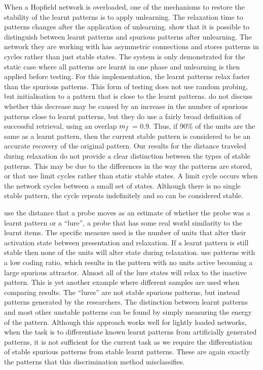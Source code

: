 When a Hopfield network is overloaded, one of the mechanisms to restore the stability of the learnt patterns is to apply unlearning.  The relaxation time to patterns changes after the application of unlearning.  
\citet{Horas2002} show that it is possible to distinguish between learnt patterns and spurious patterns after unlearning.  The network they are working with has asymmetric connections and stores patterns in cycles rather than just stable states.  The system is only demonstrated for the static case where all patterns are learnt in one phase and unlearning is then applied before testing.  For this implementation, the learnt patterns relax faster than the spurious patterns.  This form of testing does not use random probing, but initialisation to a pattern that is close to the learnt patterns. \citeauthor{Horas2002} do not discuss whether this decrease may be caused by an increase in the number of spurious patterns close to learnt patterns, but they do use a fairly broad definition of successful retrieval, using an overlap $m_f$ = 0.9.  Thus, if 90\% of the units are the same as a learnt pattern,  then the current stable pattern is considered to be an accurate recovery of the original pattern.  Our results for the distance traveled during relaxation do not provide a clear distinction between the types of stable patterns.  This may be due to the differences in the way the patterns are stored, or that \citet{Horas2002} use limit cycles rather than static stable states.  A limit cycle occurs when the network cycles between a small set of states.  Although there is no single stable pattern, the cycle repeats indefinitely and so can be considered stable.


\citet{OReilly1998} use the distance that a probe moves as an estimate of whether the probe was a learnt pattern or a ``lure'', a probe that has some real world similarity to the learnt items.  The specific measure used is the number of units that alter their activation state between presentation and relaxation.  If a learnt pattern is still stable then none of the units will alter state during relaxation.  \citeauthor{OReilly1998} use patterns with a low coding ratio, which results in the pattern with no units active becoming a large spurious attractor. Almost all of the lure states will relax to the inactive pattern.  This is yet another example where different samples are used when comparing results.  The ``lures'' are not stable spurious patterns, but instead patterns generated by the researchers.  The distinction between learnt patterns and most other unstable patterns can be found by simply measuring the energy of the pattern.  Although this approach works well for lightly loaded networks, when the task is to differentiate known learnt patterns from artificially generated patterns, it is not sufficient for the current task as we require the differentiation of stable spurious patterns from stable learnt patterns. These are again exactly the patterns that this discrimination method misclassifies.

